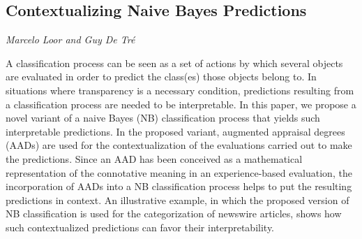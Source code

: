 \documentclass[../booklet.tex]{subfiles}
\begin{document}
\subsection[Contextualizing Naive Bayes Predictions. {\it Marcelo Loor and Guy De Tré}]{Contextualizing Naive Bayes Predictions}
 

\begin{center}
  {\it Marcelo Loor and Guy De Tré}
\end{center}



A classification process can be seen as a set of actions by which several objects are evaluated in order to predict the class(es) those objects belong to. %
%
In situations where transparency is a necessary condition, predictions resulting from a classification process are needed to be interpretable. %
%
In this paper, we propose a novel variant of a naive Bayes (NB) classification process that yields such interpretable predictions. %
%
In the proposed variant, augmented appraisal degrees (AADs) are used for the contextualization of the evaluations carried out to make the predictions. %
%
Since an AAD has been conceived as a mathematical representation of the connotative meaning in an experience-based evaluation, the incorporation of AADs into a NB classification process helps to put the resulting predictions in context. %
%
An illustrative example, in which the proposed version of NB classification is used for the categorization of newswire articles, shows how such contextualized predictions can favor their interpretability. %
%

\end{document}
